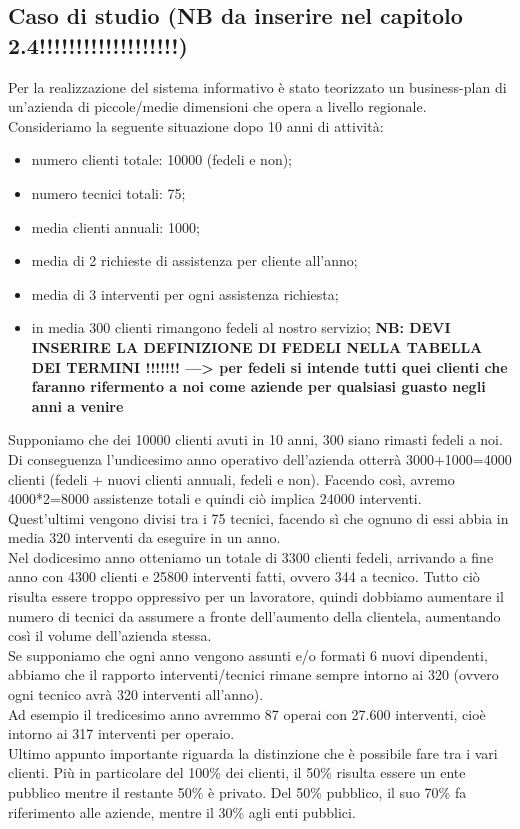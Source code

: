 \documentclass[legalpaper]{article}
\begin{document}
	\subsection{Caso di studio (NB da inserire nel capitolo 2.4!!!!!!!!!!!!!!!!!!!)} 
	Per la realizzazione del sistema informativo è stato teorizzato un business-plan di un'azienda di piccole/medie dimensioni che opera a livello regionale.
	Consideriamo la seguente situazione dopo 10 anni di attività:
	\begin{itemize}
		\item numero clienti totale: 10000 (fedeli e non);
		\item numero tecnici totali: 75;
		\item media clienti annuali: 1000;
		\item media di 2 richieste di assistenza per cliente all'anno;
		\item media di 3 interventi per ogni assistenza richiesta;
		\item in media 300 clienti rimangono fedeli al nostro servizio;
		\textbf{NB: DEVI INSERIRE LA DEFINIZIONE DI FEDELI NELLA TABELLA DEI TERMINI !!!!!!! ---> per fedeli si intende tutti quei clienti che faranno rifermento a noi come aziende per qualsiasi guasto negli anni a venire}
	\end{itemize}
	Supponiamo che dei 10000 clienti avuti in 10 anni, 300 siano rimasti fedeli a noi. Di conseguenza l'undicesimo anno operativo dell'azienda otterrà 3000+1000=4000 clienti (fedeli + nuovi clienti annuali, fedeli e non). Facendo così, avremo 4000*2=8000 assistenze totali  e quindi ciò implica 24000 interventi.\\
	Quest'ultimi vengono divisi tra i 75 tecnici, facendo sì che ognuno di essi abbia in media 320 interventi da eseguire in un anno.\\
	Nel dodicesimo anno otteniamo un totale di 3300 clienti fedeli, arrivando a fine anno con 4300 clienti e 25800 interventi fatti, ovvero 344 a tecnico. Tutto ciò risulta essere troppo oppressivo per un lavoratore, quindi dobbiamo aumentare il numero di tecnici da assumere a fronte dell'aumento della clientela, aumentando così il volume dell'azienda stessa.\\
	Se supponiamo che ogni anno vengono assunti e/o formati 6 nuovi dipendenti, abbiamo che il rapporto interventi/tecnici rimane sempre intorno ai 320 (ovvero ogni tecnico avrà 320 interventi all'anno).\\
	Ad esempio il tredicesimo anno avremmo 87 operai con 27.600 interventi, cioè intorno ai 317 interventi per operaio.\\
	Ultimo appunto importante riguarda la distinzione che è possibile fare tra i vari clienti.
	Più in particolare del 100\% dei clienti, il 50\% risulta essere un ente pubblico mentre il restante 50\% è privato. Del 50\% pubblico, il suo 70\% fa riferimento alle aziende, mentre il 30\% agli enti pubblici.
	
\end{document}
